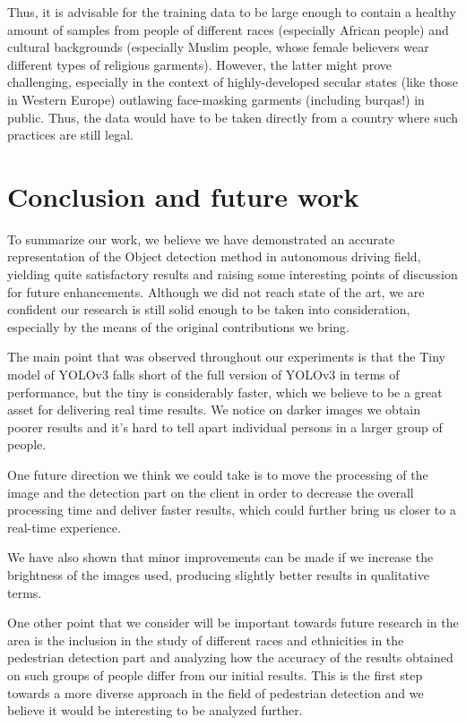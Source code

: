 \documentclass[runningheads,a4paper,11pt]{report}
\begin{document}
Thus, it is advisable for the training data to be large enough to contain a healthy amount of samples from people of different races (especially African people) and cultural backgrounds (especially Muslim people, whose female believers wear different types of religious garments). However, the latter might prove challenging, especially in the context of highly-developed secular states (like those in Western Europe) outlawing face-masking garments (including burqas!) in public. Thus, the data would have to be taken directly from a country where such practices are still legal.

\chapter{Conclusion and future work}
\label{chapter:concl}

To summarize our work, we believe we have demonstrated an accurate representation of the Object detection method in autonomous driving field, yielding quite satisfactory results and raising some interesting points of discussion for future enhancements. Although we did not reach state of the art, we are confident our research is still solid enough to be taken into consideration, especially by the means of the original contributions we bring.

The main point that was observed throughout our experiments is that  the Tiny model of YOLOv3 falls short of the full version of YOLOv3 in terms of performance, but the tiny is considerably faster, which we believe to be a great asset for delivering real time results. We notice on darker images we obtain poorer results and it's hard to tell apart individual persons in a larger group of people.

One future direction we think we could take is to move the processing of the image and the detection part on the client in order to decrease the overall processing time and deliver faster results, which could further bring us closer to a real-time experience.

We have also shown that minor improvements can be made if we increase the brightness of the images used, producing slightly better results in qualitative terms.

One other point that we consider will be important towards future research in the area is the inclusion in the study of different races and ethnicities in the pedestrian detection part and analyzing how the accuracy of the results obtained on such groups of people differ from our initial results. This is the first step towards a more diverse approach in the field of pedestrian detection and we believe it would be interesting to be analyzed further.
\end{document}
